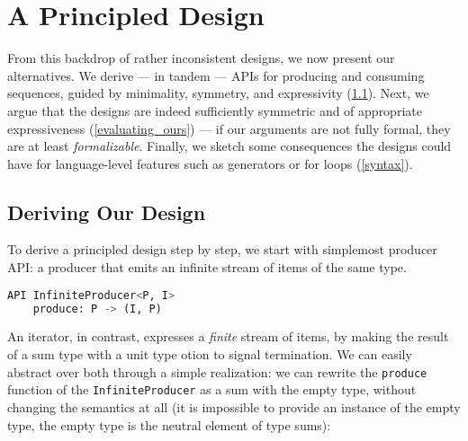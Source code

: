 \documentclass[sigplan,screen,10pt,anonymous,review]{acmart}
\begin{document}



\section{A Principled Design}\label{main_design}

From this backdrop of rather inconsistent designs, we now present our alternatives. We derive --- in tandem --- APIs for producing and consuming sequences, guided by minimality, symmetry, and expressivity (\cref{derive}). Next, we argue that the designs are indeed sufficiently symmetric and of appropriate expressiveness (\cref{evaluating_ours}) --- if our arguments are not fully formal, they are at least \textit{formalizable}. Finally, we sketch some consequences the designs could have for language-level features such as generators or for loops (\cref{syntax}).

\subsection{Deriving Our Design}\label{derive}

To derive a principled design step by step, we start with simplemost producer API: a producer that emits an infinite stream of items of the same type.

\begin{lstlisting}[language=Python]
API InfiniteProducer<P, I>
    produce: P -> (I, P)
\end{lstlisting}

An iterator, in contrast, expresses a \textit{finite} stream of items, by making the result of a sum type with a unit type otion to signal termination. We can easily abstract over both through a simple realization: we can rewrite the \texttt{produce} function of the \texttt{InfiniteProducer} as a sum with the empty type, without changing the semantics at all (it is impossible to provide an instance of the empty type, the empty type is the neutral element of type sums):
\end{document}
